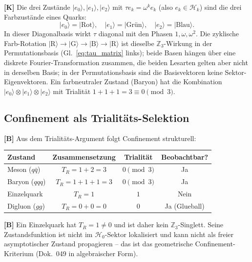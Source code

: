\textbf{[K]} Die drei Zustände $|e_0\rangle, |e_1\rangle, |e_2\rangle$
mit $\tau e_k = \omega^k e_k$ (also $e_k \in \mathcal{H}_k$) sind die drei
Farbzustände eines Quarks:
\begin{equation}
  |e_0\rangle = |\text{Rot}\rangle,\quad
  |e_1\rangle = |\text{Grün}\rangle,\quad
  |e_2\rangle = |\text{Blau}\rangle.
  \label{eq:farbzust}
\end{equation}
In dieser Diagonalbasis wirkt $\tau$ diagonal mit den Phasen
$1, \omega, \omega^2$. Die zyklische Farb-Rotation
$|\text{R}\rangle \to |\text{G}\rangle \to |\text{B}\rangle \to |\text{R}\rangle$
ist dieselbe $\mathbb{Z}_3$-Wirkung in der Permutationsbasis
(Gl.~\eqref{eq:tau_matrix} links); beide Basen hängen über eine diskrete
Fourier-Transformation zusammen, die beiden Lesarten gelten aber nicht in
derselben Basis; in der Permutationsbasis sind die Basisvektoren keine
Sektor-Eigenvektoren. Ein farbneutraler Zustand (Baryon) hat
die Kombination $|e_0\rangle \otimes |e_1\rangle \otimes |e_2\rangle$
mit Trialität $1+1+1 = 3 \equiv 0 \pmod{3}$.

\subsection{Confinement als Trialitäts-Selektion}

\textbf{[B]} Aus dem Trialitäts-Argument folgt Confinement strukturell:

\begin{center}
\begin{tabular}{lccc}
\toprule
Zustand & Zusammensetzung & Trialität & Beobachtbar? \\
\midrule
Meson ($q\bar{q}$) & $T_R = 1+2 = 3$ & $0 \pmod{3}$ & Ja \\
Baryon ($qqq$)     & $T_R = 1+1+1 = 3$ & $0 \pmod{3}$ & Ja \\
Einzelquark        & $T_R = 1$          & $1$          & Nein \\
Digluon ($gg$)     & $T_R = 0+0 = 0$   & $0$          & Ja (Glueball) \\
\bottomrule
\end{tabular}
\end{center}

\textbf{[B]} Ein Einzelquark hat $T_R = 1 \neq 0$ und ist daher kein
$\mathbb{Z}_3$-Singlett. Seine Zustandsfunktion ist nicht im
$\mathcal{H}_0$-Sektor lokalisiert und kann nicht als freier
asymptotischer Zustand propagieren -- das ist das geometrische
Confinement-Kriterium (Dok.~049 in algebraischer Form).

